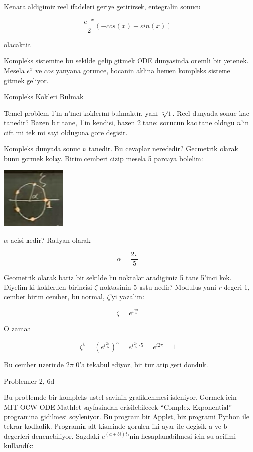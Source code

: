 \documentclass[12pt,fleqn]{article}
\begin{document}
Kenara aldigimiz reel ifadeleri geriye getirirsek, entegralin sonucu

\[ \frac{e^{-x}}{2}(-cos(x) + sin(x)) \]

olacaktir. 

Kompleks sistemine bu sekilde gelip gitmek ODE dunyasinda onemli bir
yetenek. Mesela $e^{x}$ ve $cos$ yanyana gorunce, hocanin aklina hemen
kompleks sisteme gitmek geliyor. 

Kompleks Kokleri Bulmak

Temel problem 1'in n'inci koklerini bulmaktir, yani $\sqrt[n]{1}$. Reel
dunyada sonuc kac tanedir? Bazen bir tane, 1'in kendisi, bazen 2 tane:
sonucun kac tane oldugu $n$'in cift mi tek mi sayi olduguna gore degisir.

Kompleks dunyada sonuc $n$ tanedir. Bu cevaplar nerededir? Geometrik olarak
bunu gormek kolay. Birim cemberi cizip mesela 5 parcaya bolelim:

\includegraphics[height=3cm]{6_5.png}

$\alpha$ acisi nedir? Radyan olarak 

\[ \alpha = \frac{2\pi}{5} \]

Geometrik olarak bariz bir sekilde bu noktalar aradigimiz 5 tane 5'inci
kok. Diyelim ki koklerden birincisi $\zeta$ noktasinin 5 ustu nedir?
Modulus yani $r$ degeri 1, cember birim cember, bu normal, $\zeta$'yi yazalim:

\[ \zeta = e^{i\frac{2\pi}{5}} \]

O zaman

\[ 
\zeta^5 = (e^{i\frac{2\pi}{5}})^5 = e^{i\frac{2\pi}{5} \cdot 5} = e^{i2\pi} =
1 
\]

Bu cember uzerinde $2\pi$ 0'a tekabul ediyor, bir tur atip geri donduk. 

Problemler 2, 6d

Bu problemde bir kompleks ustel sayinin grafiklenmesi isleniyor. Gormek
icin MIT OCW ODE Mathlet sayfasindan erisilebilecek ``Complex Exponential''
programina gidilmesi soyleniyor. Bu program bir Applet, biz programi Python
ile tekrar kodladik. Programin alt kisminde gorulen iki ayar ile degisik a
ve b degerleri denenebiliyor. Sagdaki $e^{(a+bi)t}$'nin hesaplanabilmesi
icin su acilimi kullandik:
\end{document}
